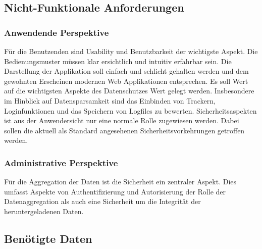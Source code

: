 

\subsection{Nicht-Funktionale Anforderungen}
    
    \subsubsection{Anwendende Perspektive}
        Für die Benutzenden sind Usability und Benutzbarkeit der wichtigste Aspekt. Die Bedienungsmuster müssen klar ersichtlich und intuitiv erfahrbar sein. Die Darstellung der Applikation soll einfach und schlicht gehalten werden und dem gewohnten Erscheinen modernen Web Applikationen entsprechen. 
        Es soll Wert auf die wichtigsten Aspekte des Datenschutzes Wert gelegt werden. Insbesondere im Hinblick auf Datensparsamkeit sind das Einbinden von Trackern, Loginfunktionen und das Speichern von Logfiles zu bewerten.
        Sicherheitsaspekten ist aus der Anwendersicht nur eine normale Rolle zugewiesen werden. Dabei sollen die aktuell als Standard angesehenen Sicherheitsvorkehrungen getroffen werden.
        
    \subsubsection{Administrative Perspektive}
        Für die Aggregation der Daten ist die Sicherheit ein zentraler Aspekt. Dies umfasst  Aspekte von Authentifizierung und Autorisierung der Rolle der Datenaggregation als auch eine Sicherheit um die Integrität der heruntergeladenen Daten.
        
    

\subsection{Benötigte Daten}

